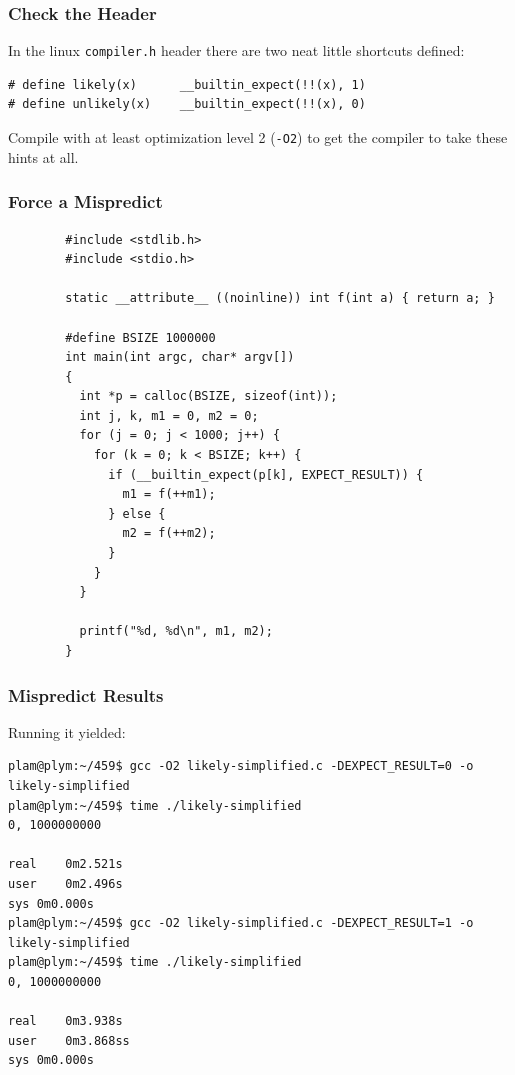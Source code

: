 \begin{frame}[fragile]
\frametitle{Check the Header}

In the linux \texttt{compiler.h} header there are two neat little shortcuts defined:

\begin{verbatim}
# define likely(x)      __builtin_expect(!!(x), 1)
# define unlikely(x)    __builtin_expect(!!(x), 0)
\end{verbatim}

Compile with at least optimization level 2 (\texttt{-O2}) to get the compiler to take these hints at all.

\end{frame}



\begin{frame}[fragile]
\frametitle{Force a Mispredict}
{\scriptsize
\begin{verbatim}
        #include <stdlib.h>
        #include <stdio.h>

        static __attribute__ ((noinline)) int f(int a) { return a; }

        #define BSIZE 1000000
        int main(int argc, char* argv[]) 
        {
          int *p = calloc(BSIZE, sizeof(int));
          int j, k, m1 = 0, m2 = 0;
          for (j = 0; j < 1000; j++) {
            for (k = 0; k < BSIZE; k++) {
              if (__builtin_expect(p[k], EXPECT_RESULT)) {
                m1 = f(++m1);
              } else {
                m2 = f(++m2);
              }
            }
          }

          printf("%d, %d\n", m1, m2);
        }
\end{verbatim}
}

\end{frame}



\begin{frame}[fragile]
\frametitle{Mispredict Results}

Running it yielded:
{\scriptsize
\begin{verbatim}
plam@plym:~/459$ gcc -O2 likely-simplified.c -DEXPECT_RESULT=0 -o likely-simplified
plam@plym:~/459$ time ./likely-simplified
0, 1000000000

real	0m2.521s
user	0m2.496s
sys	0m0.000s
plam@plym:~/459$ gcc -O2 likely-simplified.c -DEXPECT_RESULT=1 -o likely-simplified
plam@plym:~/459$ time ./likely-simplified
0, 1000000000

real	0m3.938s
user	0m3.868ss
sys	0m0.000s
\end{verbatim}
}
\end{frame}



